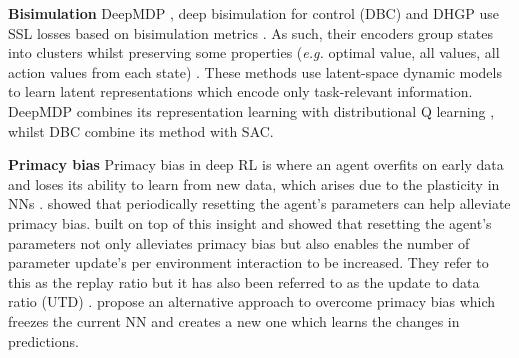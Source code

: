 \documentclass{article}
\makeatletter
\theoremstyle{plain}
\theoremstyle{definition}
\theoremstyle{remark}
\newcommand{\eg}{\textit{e.g.\@}\xspace}
\makeatother
\begin{document}
\textbf{Bisimulation}
DeepMDP \citep{geladaDeepMDPLearningContinuous2019},
deep bisimulation for control (DBC) \citep{zhangLearningInvariantRepresentations2020}
and DHGP \citep{rezaei-shoshtariContinuousMDPHomomorphisms2022}
use SSL losses based on bisimulation metrics \citep{larsenBisimulationProbabilisticTesting1989}.
As such, their encoders group states into clusters whilst preserving some properties
(\eg optimal value, all values, all action values from each state) \citep{liUnifiedTheoryState2006}.
These methods use latent-space dynamic models to learn latent representations which encode only task-relevant information.
DeepMDP \citep{geladaDeepMDPLearningContinuous2019} combines its representation learning with
distributional Q learning  \citep[C51,][]{bellemareDistributionalPerspectiveReinforcement2017},
whilst DBC \citep{zhangLearningInvariantRepresentations2020} combine its method with SAC.






\textbf{Primacy bias}
Primacy bias in deep RL \citep{nikishinPrimacyBiasDeep2022}
is where an agent overfits on early data and loses its ability to learn from new data,
which arises due to the plasticity in NNs \citep{lyleUnderstandingPlasticityNeural2023} .
\citet{nikishinPrimacyBiasDeep2022} showed that periodically resetting the agent's parameters can help alleviate primacy bias.
\citet{doroSampleEfficientReinforcementLearning2022} built on top of this insight and showed that resetting the
agent's parameters not only alleviates primacy bias but also
enables the number of parameter update's per environment interaction to be increased.
They refer to this as the replay ratio but it has also been referred to as the update to data
ratio (UTD) \citep{chenRandomizedEnsembledDouble2021}.
\citet{nikishinDeepReinforcementLearning2023} propose an alternative approach to overcome primacy bias which
freezes the current NN and creates a new one which learns the changes in predictions.
\end{document}
